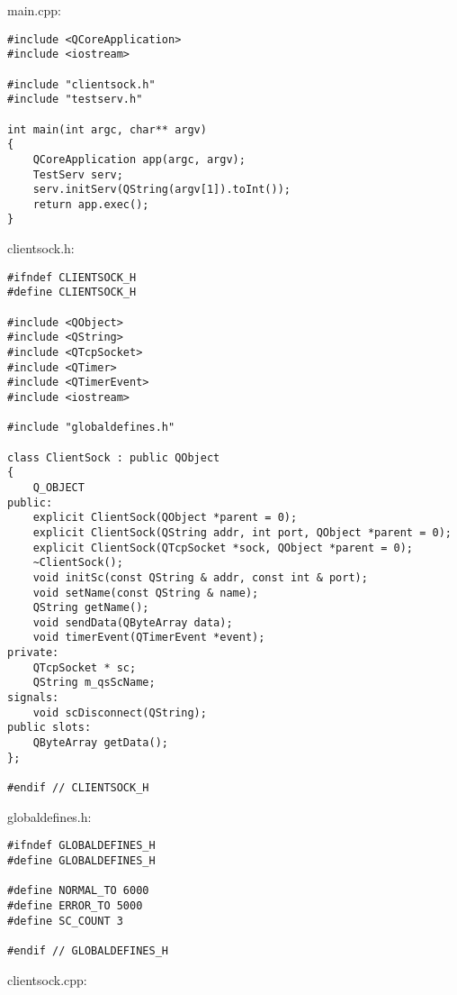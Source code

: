 
main.cpp:

\begin{lstlisting}
#include <QCoreApplication>
#include <iostream>

#include "clientsock.h"
#include "testserv.h"

int main(int argc, char** argv)
{
	QCoreApplication app(argc, argv);
    TestServ serv;
    serv.initServ(QString(argv[1]).toInt());
	return app.exec();
}

\end{lstlisting}

clientsock.h:

\begin{lstlisting}
#ifndef CLIENTSOCK_H
#define CLIENTSOCK_H

#include <QObject>
#include <QString>
#include <QTcpSocket>
#include <QTimer>
#include <QTimerEvent>
#include <iostream>

#include "globaldefines.h"

class ClientSock : public QObject
{
    Q_OBJECT
public:
    explicit ClientSock(QObject *parent = 0);
    explicit ClientSock(QString addr, int port, QObject *parent = 0);
    explicit ClientSock(QTcpSocket *sock, QObject *parent = 0);
    ~ClientSock();
    void initSc(const QString & addr, const int & port);
    void setName(const QString & name);
    QString getName();
    void sendData(QByteArray data);
    void timerEvent(QTimerEvent *event);
private:
    QTcpSocket * sc;
    QString m_qsScName;
signals:
    void scDisconnect(QString);
public slots:
    QByteArray getData();
};

#endif // CLIENTSOCK_H

\end{lstlisting}

globaldefines.h:

\begin{lstlisting}
#ifndef GLOBALDEFINES_H
#define GLOBALDEFINES_H

#define NORMAL_TO 6000
#define ERROR_TO 5000
#define SC_COUNT 3

#endif // GLOBALDEFINES_H

\end{lstlisting}

clientsock.cpp:

